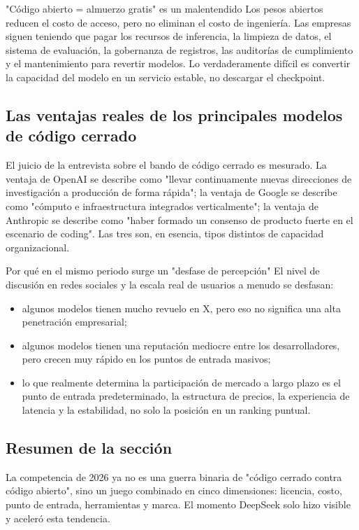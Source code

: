 \begin{warningbox}{"Código abierto = almuerzo gratis" es un malentendido}
Los pesos abiertos reducen el costo de acceso, pero no eliminan el costo de ingeniería. Las empresas siguen teniendo que pagar los recursos de inferencia, la limpieza de datos, el sistema de evaluación, la gobernanza de registros, las auditorías de cumplimiento y el mantenimiento para revertir modelos. Lo verdaderamente difícil es convertir la capacidad del modelo en un servicio estable, no descargar el checkpoint.
\end{warningbox}

\subsection{Las ventajas reales de los principales modelos de código cerrado}

El juicio de la entrevista sobre el bando de código cerrado es mesurado. La ventaja de OpenAI se describe como "llevar continuamente nuevas direcciones de investigación a producción de forma rápida"; la ventaja de Google se describe como "cómputo e infraestructura integrados verticalmente"; la ventaja de Anthropic se describe como "haber formado un consenso de producto fuerte en el escenario de coding". Las tres son, en esencia, tipos distintos de capacidad organizacional.

\begin{knowledgebox}{Por qué en el mismo periodo surge un "desfase de percepción"}
El nivel de discusión en redes sociales y la escala real de usuarios a menudo se desfasan:
\begin{itemize}[leftmargin=1.5em]
    \item algunos modelos tienen mucho revuelo en X, pero eso no significa una alta penetración empresarial;
    \item algunos modelos tienen una reputación mediocre entre los desarrolladores, pero crecen muy rápido en los puntos de entrada masivos;
    \item lo que realmente determina la participación de mercado a largo plazo es el punto de entrada predeterminado, la estructura de precios, la experiencia de latencia y la estabilidad, no solo la posición en un ranking puntual.
\end{itemize}
\end{knowledgebox}

\subsection{Resumen de la sección}

La competencia de 2026 ya no es una guerra binaria de "código cerrado contra código abierto", sino un juego combinado en cinco dimensiones: licencia, costo, punto de entrada, herramientas y marca. El momento DeepSeek solo hizo visible y aceleró esta tendencia.

